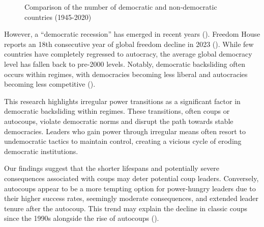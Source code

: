 \documentclass[
  12pt,
]{report}
\begin{document}
\begin{figure}


\caption{\label{fig-democracy}Comparison of the number of democratic and
non-democratic countries (1945-2020)}

\end{figure}%

However, a ``democratic recession'' has emerged in recent years
(). Freedom House reports an
18th consecutive year of global freedom decline in 2023
(). While few
countries have completely regressed to autocracy, the average global
democracy level has fallen back to pre-2000 levels. Notably, democratic
backsliding often occurs within regimes, with democracies becoming less
liberal and autocracies becoming less competitive
().

This research highlights irregular power transitions as a significant
factor in democratic backsliding within regimes. These transitions,
often coups or autocoups, violate democratic norms and disrupt the path
towards stable democracies. Leaders who gain power through irregular
means often resort to undemocratic tactics to maintain control, creating
a vicious cycle of eroding democratic institutions.

Our findings suggest that the shorter lifespans and potentially severe
consequences associated with coups may deter potential coup leaders.
Conversely, autocoups appear to be a more tempting option for
power-hungry leaders due to their higher success rates, seemingly
moderate consequences, and extended leader tenure after the autocoup.
This trend may explain the decline in classic coups since the 1990s
alongside the rise of autocoups ().
\end{document}
